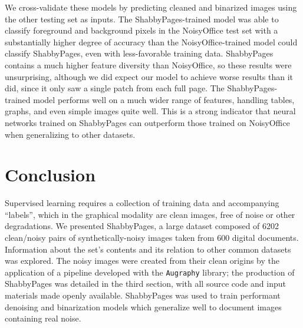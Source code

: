 \documentclass[runningheads]{llncs}
\begin{document}
We cross-validate these models by predicting cleaned and binarized images using the other testing set as inputs.
The ShabbyPages-trained model was able to classify foreground and background pixels in the NoisyOffice test set with a substantially higher degree of accuracy than the NoisyOffice-trained model could classify ShabbyPages, even with less-favorable training data.
ShabbyPages contains a much higher feature diversity than NoisyOffice, so these results were unsurprising, although we did expect our model to achieve worse results than it did, since it only saw a single patch from each full page.
The ShabbyPages-trained model performs well on a much wider range of features, handling tables, graphs, and even simple images quite well.
This is a strong indicator that neural networks trained on ShabbyPages can outperform those trained on NoisyOffice when generalizing to other datasets.

\section{Conclusion}
Supervised learning requires a collection of training data and accompanying ``labels'', which in the graphical modality are clean images, free of noise or other degradations.
We presented ShabbyPages, a large dataset composed of 6202 clean/noisy pairs of synthetically-noisy images taken from 600 digital documents.
Information about the set's contents and its relation to other common datasets was explored.
The noisy images were created from their clean origins by the application of a pipeline developed with the \texttt{Augraphy} library; the production of ShabbyPages was detailed in the third section, with all source code and input materials made openly available.
ShabbyPages was used to train performant denoising and binarization models which generalize well to document images containing real noise.



\end{document}
